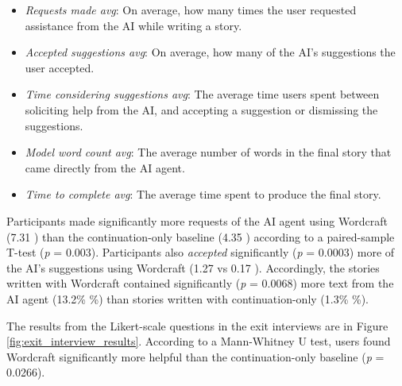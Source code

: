 \begin{itemize}
    \item \textit{Requests made avg}: On average, how many times the user requested assistance from the AI while writing a story.
    \item \textit{Accepted suggestions avg}: On average, how many of the AI's suggestions the user accepted.
    \item \textit{Time considering suggestions avg}: The average time users spent between soliciting help from the AI, and accepting a suggestion or dismissing the suggestions.
    \item \textit{Model word count avg}: The average number of words in the final story that came directly from the AI agent.
    \item \textit{Time to complete avg}: The average time spent to produce the final story.
\end{itemize}


Participants made significantly more requests of the AI agent using Wordcraft (7.31 ) than the continuation-only baseline (4.35 ) according to a paired-sample T-test (\textit{p} = 0.003). Participants also \textit{accepted} significantly (\textit{p} = 0.0003) more of the AI's suggestions using Wordcraft (1.27  vs 0.17 ). Accordingly, the stories written with Wordcraft contained significantly (\textit{p} = 0.0068) more text from the AI agent (13.2\% \%) than stories written with continuation-only (1.3\% \%).



The results from the Likert-scale questions in the exit interviews are in Figure \ref{fig:exit_interview_results}. According to a Mann-Whitney U test, users found Wordcraft significantly more helpful than the continuation-only baseline (\textit{p} = 0.0266).

